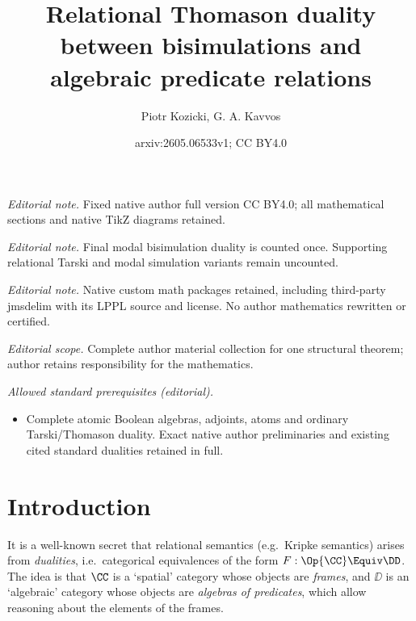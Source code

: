 \documentclass[10pt,a4paper]{article}
\title{Relational Thomason duality between bisimulations and algebraic predicate relations}
\author{Piotr Kozicki, G. A. Kavvos}
\date{arxiv:2605.06533v1; CC BY4.0}
\begin{document}
\maketitle
\noindent\textit{Editorial note.} Fixed native author full version CC BY4.0; all mathematical sections and native TikZ diagrams retained.\par\medskip
\noindent\textit{Editorial note.} Final modal bisimulation duality is counted once. Supporting relational Tarski and modal simulation variants remain uncounted.\par\medskip
\noindent\textit{Editorial note.} Native custom math packages retained, including third-party jmsdelim with its LPPL source and license. No author mathematics rewritten or certified.\par\medskip
\noindent\textit{Editorial scope.} Complete author material collection for one structural theorem; author retains responsibility for the mathematics.\par\medskip
\noindent\textit{Allowed standard prerequisites (editorial).}\begin{itemize}
\item Complete atomic Boolean algebras, adjoints, atoms and ordinary Tarski/Thomason duality. Exact native author preliminaries and existing cited standard dualities retained in full.
\end{itemize}\medskip
\section{Introduction}\label{section:introduction}

It is a well-known secret that relational semantics (e.g.\ Kripke semantics)
arises from \emph{dualities}, i.e.\ categorical equivalences of the form $F :
\Op{\CC} \Equiv \DD$. The idea is that $\CC$ is a `spatial' category whose
objects are \emph{frames}, and $\DD$ is an `algebraic' category whose objects
are \emph{algebras of predicates}, which allow reasoning about the elements of
the frames.
\end{document}
